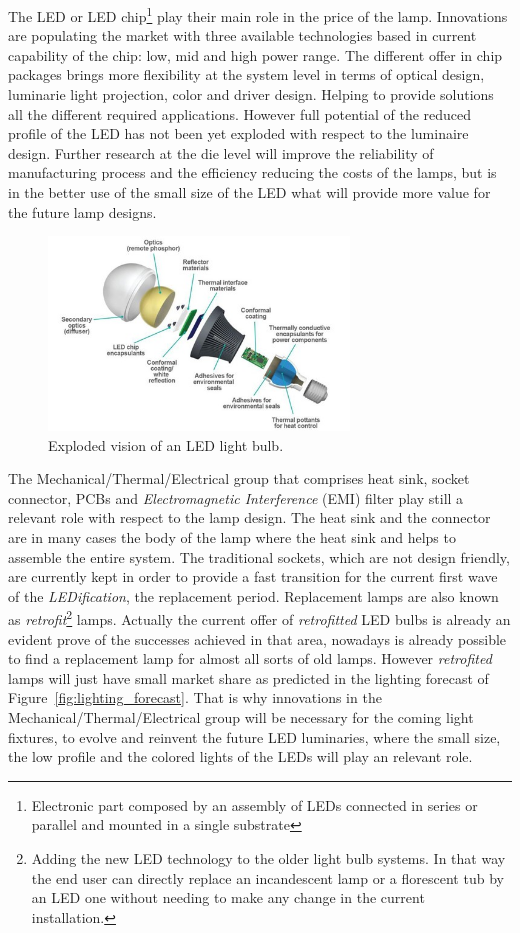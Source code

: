 The LED or LED chip\footnote{Electronic part composed by an assembly of LEDs connected in series or parallel and mounted in a single substrate} play their main role in the price of the lamp. Innovations are populating the market with three available technologies based in current capability of the chip: low, mid and high power range. The different offer in chip packages brings more flexibility at the system level in terms of optical design, luminarie light projection, color and driver design. Helping to provide solutions all the different required applications. However full potential of the reduced profile of the LED has not been yet exploded with respect to the luminaire design. Further research at the die level will improve the reliability of manufacturing process and the efficiency reducing the costs of the lamps, but is in the better use of the small size of the LED what will provide more value for the future lamp designs.

\begin{figure}[!h]
    \centering
    \includegraphics[width=8cm]{./0_intro/img/exploded_bulb_2.jpg}
    \caption{Exploded vision of an LED light bulb.}
    \label{fig:exploded_bulb}
\end{figure}


The Mechanical/Thermal/Electrical group that comprises heat sink, socket connector, PCBs and \emph{Electromagnetic Interference} (EMI) filter play still a relevant role with respect to the lamp design. The heat sink and the connector are in many cases the body of the lamp where the heat sink and helps to assemble the entire system. The traditional sockets, which are not design friendly, are currently kept in order to provide a fast transition for the current first wave of the \emph{LEDification}, the replacement period. Replacement lamps are also known as \emph{retrofit}\footnote{Adding the new LED technology to the older light bulb systems. In that way the end user can directly replace an incandescent lamp or a florescent tub by an LED one without needing to make any change in the current installation.} lamps. Actually the current offer of \emph{retrofitted} LED bulbs is already an evident prove of the successes achieved in that area, nowadays is already possible to find a replacement lamp for almost all sorts of old lamps. However \emph{retrofited} lamps will just have small market share as predicted in the lighting forecast of Figure~\ref{fig:lighting_forecast}. That is why innovations in the Mechanical/Thermal/Electrical group will be necessary for the coming light fixtures, to evolve and reinvent the future LED luminaries, where the small size, the low profile and the colored lights of the LEDs will play an relevant role.


